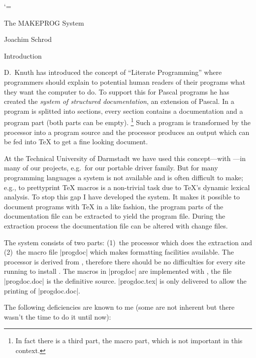 \catcode`\@=\atcode

%


\centerline{\ftnrm The MAKEPROG System}
\vskip 2mm
\centerline{\sc Joachim Schrod}



\beginsection Introduction

D.~Knuth has introduced the concept of ``Literate Programming'' where
programmers should explain to potential human readers of their
programs what they want the computer to do.  To support this for
Pascal programs he has created the {\sl \WEB{} system of structured
documentation}, an extension of Pascal.  In \WEB{} a program is
splitted into sections, every section contains a documentation and a
program part (both parts can be empty).%
\footnote*{In fact there is a third part, the macro part, which is not
important in this context.}
Such a \WEB{} program is transformed by the \TANGLE{} processor into a
program source and the \WEAVE{} processor produces an output which can
be fed into \TeX{} to get a fine looking document.

At the Technical University of Darmstadt we have used this
concept---with \CWEB{}---in many of our projects, e.g.\ for our
portable \DVI{} driver family.  But for many programming languages a
\WEB{} system is not available and is often difficult to make; e.g.,
to prettyprint \TeX{} macros is a non-trivial task due to \TeX's
dynamic lexical analysis.  To stop this gap I have developed the
\MAKEPROG{} system.  It makes it possible to document programs with
\TeX{} in a \WEB{} like fashion, the program parts of the
documentation file can be extracted to yield the program file.  During
the extraction process the documentation file can be altered with
change files.

The \MAKEPROG{} system consists of two parts:  (1)~the \MAKEPROG{}
processor which does the extraction and (2)~the macro file |progdoc|
which makes formatting facilities available.  The \MAKEPROG{}
processor is derived from \TANGLE{}, therefore there should be no
difficulties for every site running \WEB{} to install \MAKEPROG{}.
The macros in |progdoc| are implemented with \MAKEPROG{}, the file
|progdoc.doc| is the definitive source.  |progdoc.tex| is only
delivered to allow the printing of |progdoc.doc|.

The following deficiencies are known to me (some are not inherent but
there wasn't the time to do it until now):

